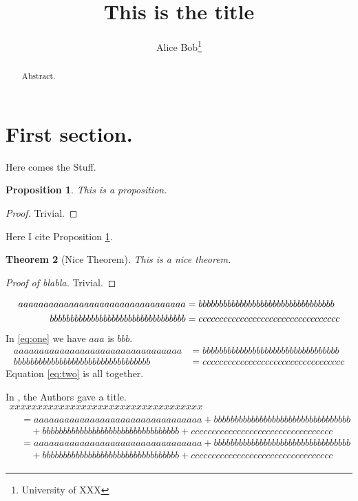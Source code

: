 \documentclass{article}
\newtheorem{tm}{Theorem}[section]
\newtheorem{pr}[tm]{Proposition}
\begin{document}
\title{This is the title}

\author{Alice Bob\footnotemark[1]\thanks{University of XXX}}

\maketitle

\begin{abstract}
 
 Abstract.

\end{abstract}

\section{First section.}

Here comes the Stuff.
\begin{pr}\label{pr:blabla}
 This is a proposition.
\end{pr}
\begin{proof}
 Trivial.
\end{proof}
Here I cite Proposition \ref{pr:blabla}.
\begin{tm}[\normalfont Nice Theorem]
 This is a nice theorem.
\end{tm}
\begin{proof}[Proof of blabla]
 Trivial.
\end{proof}
\begin{align}
 aaaaaaaaaaaaaaaaaaaaaaaaaaaaaaaaa&=bbbbbbbbbbbbbbbbbbbbbbbbbbbbbbbbb\label{eq:one}\\
 bbbbbbbbbbbbbbbbbbbbbbbbbbbbbbbbb&=cccccccccccccccccccccccccccccccccc\notag
\end{align}
In \eqref{eq:one} we have $aaa$ is $bbb$.
\begin{equation}
 \begin{aligned}
  aaaaaaaaaaaaaaaaaaaaaaaaaaaaaaaaa&=bbbbbbbbbbbbbbbbbbbbbbbbbbbbbbbbb\\
  bbbbbbbbbbbbbbbbbbbbbbbbbbbbbbbbb&=cccccccccccccccccccccccccccccccccc
 \end{aligned}\label{eq:two}
\end{equation}
Equation \eqref{eq:two} is all together.

In \cite{dummy_ref}, the Authors gave a title.
\begin{multline}
 xxxxxxxxxxxxxxxxxxxxxxxxxxxxxxxxxxx\\
 \begin{aligned}
  &=aaaaaaaaaaaaaaaaaaaaaaaaaaaaaaaaa+bbbbbbbbbbbbbbbbbbbbbbbbbbbbbbbbb\\
  &\quad+bbbbbbbbbbbbbbbbbbbbbbbbbbbbbbbbb+cccccccccccccccccccccccccccccccccc\\
  &=aaaaaaaaaaaaaaaaaaaaaaaaaaaaaaaaa+bbbbbbbbbbbbbbbbbbbbbbbbbbbbbbbbb\\
  &\quad+bbbbbbbbbbbbbbbbbbbbbbbbbbbbbbbbb+cccccccccccccccccccccccccccccccccc
 \end{aligned}\label{eq:three}
\end{multline}



\end{document}
